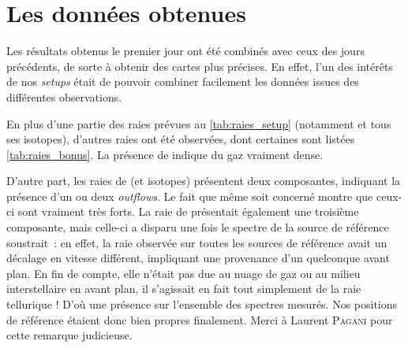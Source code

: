 \documentclass[a4paper,10pt,french]{article}
\begin{document}
\section{Les données obtenues}
\label{sec:resultats}

Les résultats obtenus le premier jour ont été combinés avec ceux des jours
précédents, de sorte à obtenir des cartes plus précises. En effet, l’un des
intérêts de nos \textit{setups} était de pouvoir combiner facilement les
données issues des différentes observations.

En plus d’une partie des raies prévues au \cref{tab:raies_setup} (notamment
 et tous ses isotopes), d’autres raies ont été observées, dont certaines
sont listées \cref{tab:raies_bonus}. La présence de  indique du gaz
vraiment dense.

D’autre part, les raies de  (et isotopes) présentent deux composantes,
indiquant la présence d’un ou deux \textit{outflows}. Le fait que même
 soit concerné montre que ceux-ci sont vraiment très forts. La raie
de  présentait également une troisième composante, mais celle-ci a
disparu une fois le spectre de la source de référence soustrait : en effet, la
raie observée sur toutes les sources de référence avait un décalage en vitesse
différent, impliquant une provenance d’un quelconque avant plan. En fin de
compte, elle n’était pas due au nuage de gaz ou au milieu interstellaire en
avant plan, il s’agissait en fait tout simplement de la raie tellurique ! D’où
une présence sur l’ensemble des spectres mesurés. Nos positions de référence
étaient donc bien propres finalement. Merci à Laurent \textsc{Pagani} pour
cette remarque judicieuse.
\end{document}
